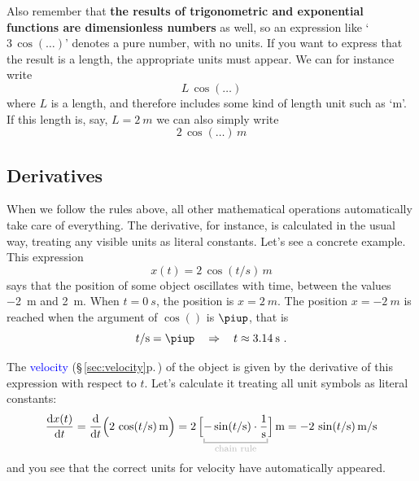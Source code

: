 \documentclass[a4paper,12pt,%
onecolumn,oneside,%
british%
]{memoir}
\newcommand*{\pu}{\piup}%
\newcommand*{\di}{\mathrm{d}}%
\newcommand*{\limplies}{\mathbin{\Rightarrow}}%
\renewcommand*{\|}[1][]{\nonscript\:#1\vert\nonscript\:\mathopen{}}
\newcommand*{\sect}{\S}%
\newcommand*{\zerob}[1]{\makebox[0pt][c]{#1}}
\renewcommand*{\autoref}[3][\sect\,\ref]{\textcolor{blue}{#3} {\color{blue}\scriptsize(\faIcon[regular]{eye}\;#1{#2}\;p.\,\pageref{#2})}}
\newcommand*{\dt}{\di t}
\begin{document}
\medskip

Also remember that \textbf{the results of trigonometric and exponential functions are dimensionless numbers} as well, so an expression like \enquote*{$3\,\cos(\dotso)$} denotes a pure number, with no units. If you want to express that the result is a length, the appropriate units must appear. We can for instance write
\begin{equation*}
  L\,\cos(\dotso)
\end{equation*}
where $L$ is a length, and therefore includes some kind of length unit such as \enquote*{\unit{m}}. If this length is, say, $L=\qty{2}{m}$ we can also simply write
\begin{equation*}
  2\,\cos(\dotso)\,\unit{m}
\end{equation*}

\subsection{Derivatives}
\label{sec:units_derivatives}

When we follow the rules above, all other mathematical operations automatically take care of everything. The derivative, for instance, is calculated in the usual way, treating any visible units as literal constants. Let's see a concrete example. This expression
\begin{equation*}
x(t) = 2\,\cos(t/\unit{s})\,\unit{m}
\end{equation*}
says that the position of some object oscillates with time, between the values \qty{-2}{m} and \qty{+2}{m}. When $t=\qty{0}{s}$, the position is $x=\qty{+2}{m}$. The position $x=\qty{-2}{m}$ is reached when the argument of $\cos()$ is $\pu$, that is
\begin{equation*}
  t/\unit{s} = \pu \quad\limplies\quad t\approx \qty{3.14}{s} \ .
\end{equation*}

The \autoref{sec:velocity}{velocity} of the object is given by the derivative of this expression with respect to $t$. Let's calculate it treating all unit symbols as literal constants:
\begin{equation*}
  \frac{\di x(t)}{\dt} = \frac{\di}{\dt}\Bigl(
  2\,\cos(t/\unit{s})\,\unit{m}
  \Bigr)
  =
  2\,\Bigl[
  \mathcolor{grey}{\underbracket{\color{black}-\sin(t/\unit{s})\cdot\frac{1}{\unit{s}}}_{\zerob{\color{grey}\footnotesize chain rule}}}
  \Bigr]\,\unit{m}
  =
 -2\,\sin(t/\unit{s})\,\unit{m/s}
\end{equation*}
and you see that the correct units for velocity have automatically appeared.
\end{document}
